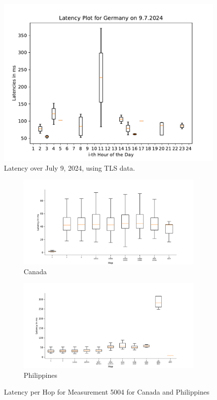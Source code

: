 \begin{figure}
	\includegraphics[width=\textwidth]{./chapters/appendix/img/latency_plot_for_Germany_on_9.7.2024.pdf}
	\caption{Latency over July 9, 2024, using TLS data.}
	\label{fig:tls-analysis-individual-day}
\end{figure}

\begin{figure}
	\centering
	\begin{subfigure}[b]{\linewidth}
		\includegraphics[width=\linewidth]{chapters/4-results/traceroute/img/latency-per-hop-CA-5004.pdf}
		\caption{Canada}
	\end{subfigure}
	\begin{subfigure}[b]{\linewidth}
		\includegraphics[width=\linewidth]{chapters/4-results/traceroute/img/latency-per-hop-PH-5004.pdf}
		\caption{Philippines}
	\end{subfigure}
	\caption{Latency per Hop for Measurement 5004 for Canada and
		Philippines}
	\label{fig:latency-change-per-hop-appendix-1}
\end{figure}

